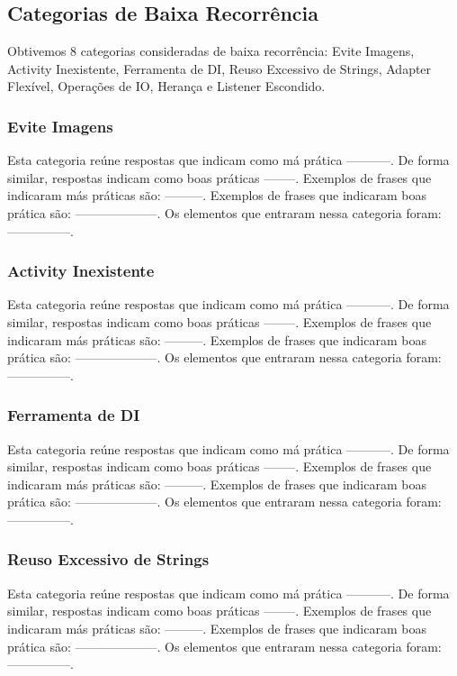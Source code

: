 \subsection{Categorias de Baixa Recorr\^encia}
Obtivemos 8 categorias consideradas de baixa recorr\^encia: Evite Imagens, Activity Inexistente, Ferramenta de DI, Reuso Excessivo de Strings, Adapter Flex\'ivel, Opera\c{c}\~oes de IO, Heran\c{c}a e Listener Escondido.

\subsubsection{Evite Imagens}
Esta categoria re\'une respostas que indicam como m\'a pr\'atica -----------. De forma similar, respostas indicam como boas pr\'aticas --------. Exemplos de frases que indicaram m\'as pr\'aticas s\~ao: ---------. Exemplos de frases que indicaram boas pr\'atica s\~ao: --------------------. Os elementos que entraram nessa categoria foram: ---------------. 


\subsubsection{Activity Inexistente}
Esta categoria re\'une respostas que indicam como m\'a pr\'atica -----------. De forma similar, respostas indicam como boas pr\'aticas --------. Exemplos de frases que indicaram m\'as pr\'aticas s\~ao: ---------. Exemplos de frases que indicaram boas pr\'atica s\~ao: --------------------. Os elementos que entraram nessa categoria foram: ---------------. 


\subsubsection{Ferramenta de DI}
Esta categoria re\'une respostas que indicam como m\'a pr\'atica -----------. De forma similar, respostas indicam como boas pr\'aticas --------. Exemplos de frases que indicaram m\'as pr\'aticas s\~ao: ---------. Exemplos de frases que indicaram boas pr\'atica s\~ao: --------------------. Os elementos que entraram nessa categoria foram: ---------------. 


\subsubsection{Reuso Excessivo de Strings}
Esta categoria re\'une respostas que indicam como m\'a pr\'atica -----------. De forma similar, respostas indicam como boas pr\'aticas --------. Exemplos de frases que indicaram m\'as pr\'aticas s\~ao: ---------. Exemplos de frases que indicaram boas pr\'atica s\~ao: --------------------. Os elementos que entraram nessa categoria foram: ---------------. 


